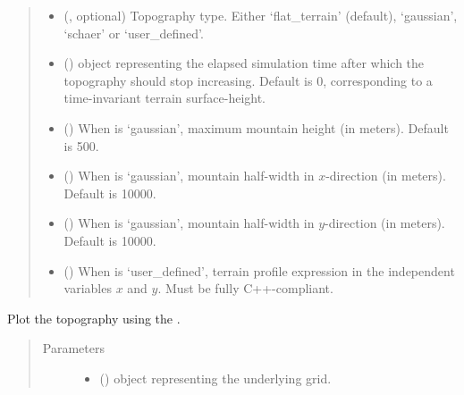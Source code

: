 \documentclass[letterpaper,10pt,english]{sphinxmanual}
\begin{document}
\begin{fulllineitems}
\begin{fulllineitems}
\begin{quote}
\begin{description}
\begin{itemize}
\item {} 
 (, optional) \textendash{} Topography type. Either ‘flat\_terrain’ (default), ‘gaussian’,
‘schaer’ or ‘user\_defined’.

\item {} 
 () \textendash{}  object representing the elapsed simulation time
after which the topography should stop increasing. Default is 0, corresponding to a
time-invariant terrain surface-height.

\item {} 
 () \textendash{} When  is ‘gaussian’, maximum mountain
height (in meters). Default is 500.

\item {} 
 () \textendash{} When  is ‘gaussian’, mountain half-width in
\(x\)-direction (in meters). Default is 10000.

\item {} 
 () \textendash{} When  is ‘gaussian’, mountain half-width in
\(y\)-direction (in meters). Default is 10000.

\item {} 
 () \textendash{} When  is ‘user\_defined’, terrain profile expression
in the independent variables \(x\) and \(y\). Must be fully C++-compliant.

\end{itemize}

\end{description}\end{quote}

\end{fulllineitems}


\begin{fulllineitems}
\label{\detokenize{api:grids.topography.Topography2d.plot}}
Plot the topography using the .
\begin{quote}\begin{description}
\item[{Parameters}] \leavevmode\begin{itemize}
\item {} 
 () \textendash{} {\hyperref[\detokenize{api:grids.xy_grid.XYGrid}]{}} object representing the underlying grid.


\end{itemize}
\end{description}
\end{quote}
\end{fulllineitems}
\end{fulllineitems}
\end{document}
